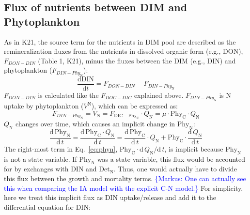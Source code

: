 \documentclass[gmd, manuscript, draft]{copernicus}
\newcommand{\markus}[1]{\textcolor{blue}{\{Markus: #1\}}}
\begin{document}

\subsection{Flux of nutrients between DIM and Phytoplankton}\label{S:DescFlux}

As in K21, the source term for the nutrients in DIM pool are described as the remineralization fluxes from the nutrients in dissolved organic form (e.g., DON), $F_{DON-DIN}$ (Table 1, K21), minus the fluxes between the DIM (e.g., DIN) and phytoplankton ($F_{DIN-Phy_{\text{N}}}$): 
\begin{equation} \label{eq:sdin}
  \frac{\text{d}\text{DIN}}{\text{d}t} = F_{DON-DIN} - F_{DIN-Phy_{\text{N}}}
\end{equation}
$F_{DON-DIN}$ is calculated like the $F_{DOC-DIC}$ explained above. $F_{DIN-Phy_{\text{N}}}$ is N uptake by phytoplankton ($V^{\text{N}}$), which can be expressed as:
\begin{equation} \label{eq:dphyNdt}
  F_{DIN-Phy_{\text{N}}} = V_{\text{N}} = F_{\text{DIC -- Phy}_{\text{C}}} \cdot Q_{\text{N}} = \mu \cdot \text{Phy}_{\text{C}} \cdot Q_{\text{N}}
\end{equation}
$Q_{\text{N}}$ changes over time, which causes an implicit change in $\text{Phy}_{\text{N}}$:
\begin{equation}
  \label{eq:phyn}
  \frac{\mathrm{d}\,\text{Phy}_{\text{N}}}{\mathrm{d}\,t} = \frac{\mathrm{d}\,\text{Phy}_{\text{C}}\cdot Q_{\text{N}}}{\mathrm{d}\,t}
  = \frac{\mathrm{d}\,\text{Phy}_{\text{C}}}{\mathrm{d}\,t} \cdot Q_{\text{N}} + \text{Phy}_{\text{C}} \cdot \frac{\mathrm{d}\,Q_{\text{N}}}{\mathrm{d}\,t}
\end{equation}
The right-most term in Eq.~\eqref{eq:phyn}, $\text{Phy}_{\text{C}}\cdot \mathrm{d}\,Q_{\text{N}} / \mathrm{d}\, t$, is implicit because $\text{Phy}_{\text{N}}$ is not a state variable.  If $\text{Phy}_{\text{N}}$ was a state variable, this flux would be accounted for by exchanges with DIN and $\text{Det}_{\text{N}}$.  Thus, one would actually have to divide this flux between the growth and mortality terms. \markus{One can actually see this when comparing the IA model with the explicit C-N model.}  For simplicity, here we treat this implicit flux as DIN uptake/release and add it to the differential equation for DIN\@:
\end{document}
